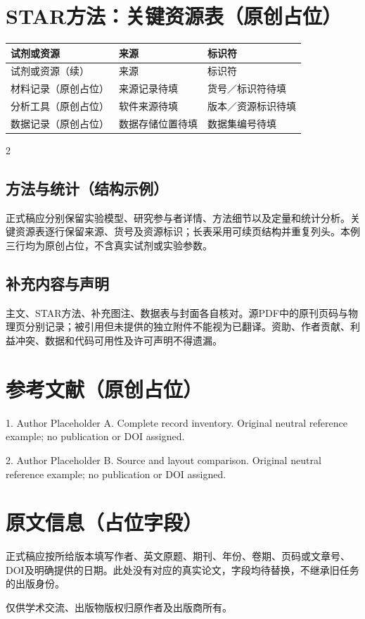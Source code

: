 \documentclass[UTF8,fontset=none,twoside,scheme=plain]{ctexart}
\begin{document}
\section*{STAR方法：关键资源表（原创占位）}
{\fontsize{7.6bp}{9.7bp}\selectfont\setlength{\tabcolsep}{4bp}
\begin{longtable}{@{}p{}p{}p{}@{}}
\toprule 试剂或资源 & 来源 & 标识符\\\midrule\endfirsthead
\toprule 试剂或资源（续） & 来源 & 标识符\\\midrule\endhead
\bottomrule\endfoot
材料记录（原创占位） & 来源记录待填 & 货号／标识符待填\\
分析工具（原创占位） & 软件来源待填 & 版本／资源标识待填\\
数据记录（原创占位） & 数据存储位置待填 & 数据集编号待填\\
\end{longtable}}
\begin{multicols}{2}
\subsection*{方法与统计（结构示例）}
正式稿应分别保留实验模型、研究参与者详情、方法细节以及定量和统计分析。关键资源表逐行保留来源、货号及资源标识；长表采用可续页结构并重复列头。本例三行均为原创占位，不含真实试剂或实验参数。
\subsection*{补充内容与声明}
主文、STAR方法、补充图注、数据表与封面各自核对。源PDF中的原刊页码与物理页分别记录；被引用但未提供的独立附件不能视为已翻译。资助、作者贡献、利益冲突、数据和代码可用性及许可声明不得遗漏。
\section*{参考文献（原创占位）}
{\fontsize{7.6bp}{9.8bp}\selectfont{}
\noindent\hypertarget{devcell-ref:1}{1.} Author Placeholder A. Complete record inventory. Original neutral reference example; no publication or DOI assigned.\par\smallskip
\noindent\hypertarget{devcell-ref:2}{2.} Author Placeholder B. Source and layout comparison. Original neutral reference example; no publication or DOI assigned.\par}
\section*{原文信息（占位字段）}
正式稿应按所给版本填写作者、英文原题、期刊、年份、卷期、页码或文章号、DOI及明确提供的日期。此处没有对应的真实论文，字段均待替换，不继承旧任务的出版身份。\par
仅供学术交流、出版物版权归原作者及出版商所有。
\end{multicols}
\end{document}

